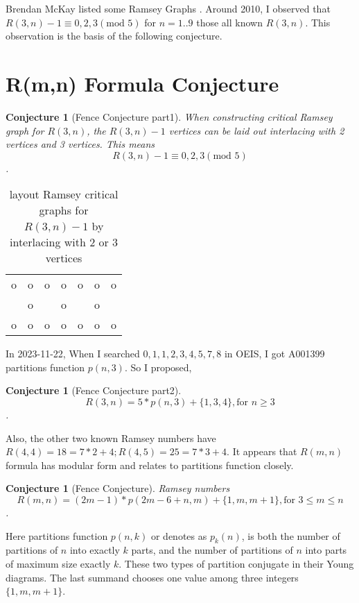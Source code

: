 \documentclass[12pt]{article}
\newtheorem{conjecture}[theorem]{Conjecture}
\begin{document}
Brendan McKay listed some Ramsey Graphs \cite{RamseyGraphs}. 
Around 2010, I observed that $R(3,n)-1\equiv 0,2,3 (\text{mod } 5)$ for $n=1..9$ those all known $R(3,n)$.
This observation is the basis of the following conjecture.

\section{R(m,n) Formula Conjecture}\label{FormulaConjecture}

\begin{conjecture}[Fence Conjecture part1]\label{FCpart1}
  When constructing critical Ramsey graph for $R(3,n)$, 
  the $R(3,n)-1$ vertices can be laid out interlacing with 2 vertices and 3 vertices. 
  This means  \[R(3,n)-1 \equiv 0,2,3 (\text{mod }5)\] . 
\end{conjecture}

\begin{table}[]
  \caption{layout Ramsey critical graphs for $R(3,n)-1$ by interlacing with 2 or 3 vertices}
  \label{tab:interlacing23}
  \begin{tabular}{lllllll}
  o & o & o & o & o & o & o \\
    & o &   & o &   & o &   \\
  o & o & o & o & o & o & o
  \end{tabular}
  \end{table}

  
In 2023-11-22, When I searched $0,1,1,2,3,4,5,7,8$ in OEIS, I got A001399 \cite{A001399} partitions function $p(n,3)$.
So I proposed, 

\begin{conjecture}[Fence Conjecture part2]\label{FCpart2}
  \[R(3,n)=5*p(n,3)+\{1,3,4\}, \text{for } n\geq 3\] .
\end{conjecture}

Also, the other two known Ramsey numbers have $R(4,4)=18=7*2+4; R(4,5)=25=7*3+4$. 
It appears that $R(m, n)$ formula has modular form and relates to partitions function closely.

\begin{conjecture}[Fence Conjecture]\label{FC}
Ramsey numbers
\[R(m,n)=(2m-1)*p(2m-6+n,m)+\{1,m,m+1\}, \text{for } 3\leq m\leq n\].
\end{conjecture}

Here partitions function $p(n,k)$ \cite{A008284} or denotes as $p_k(n)$, is both the number of partitions of $n$ into exactly $k$ parts, and the number of partitions of $n$ into parts of maximum size exactly $k$. 
These two types of partition conjugate in their Young diagrams. 
The last summand chooses one value among three integers $\{1,m,m+1\}$.
\end{document}
